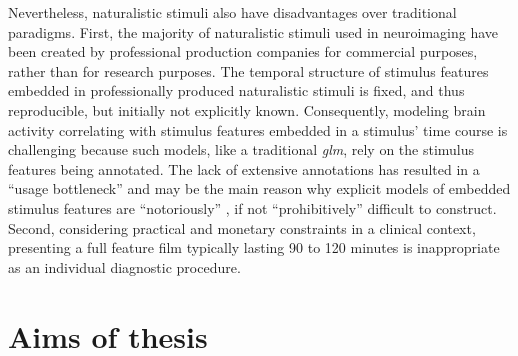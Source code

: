 Nevertheless, naturalistic stimuli also have disadvantages over traditional
paradigms.
First, the majority of naturalistic stimuli used in neuroimaging have been
created by professional production companies for commercial purposes, rather
than for research purposes.
The temporal structure of stimulus features embedded in professionally produced
naturalistic stimuli is fixed, and thus reproducible, but initially not
explicitly known.
Consequently, modeling brain activity correlating with stimulus features
embedded in a stimulus' time course is challenging
\citep{saarimaki2021naturalistic, simony2020analysis} because such models, like
a traditional \textit{\ac{glm}}, rely on the stimulus features being annotated.
The lack of extensive annotations has resulted in a ``usage bottleneck''
\citep[][p.  16]{aliko2020naturalistic} and may be the main reason why explicit
models of embedded stimulus features are ``notoriously'' \citep[][p.
1]{richard2019fast}, if not ``prohibitively'' \citep[p.
676]{nastase2019measuring} difficult to construct.
Second, considering practical and monetary constraints in a clinical context,
presenting a full feature film typically lasting 90 to 120 minutes is
inappropriate as an individual diagnostic procedure.





\section{Aims of thesis}





